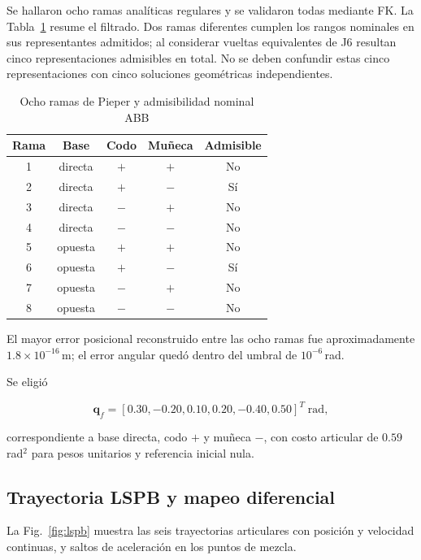 \documentclass[conference]{IEEEtran}
\begin{document}
Se hallaron ocho ramas analíticas regulares y se validaron todas mediante FK. La Tabla~\ref{tab:ramas} resume el filtrado. Dos ramas diferentes cumplen los rangos nominales en sus representantes admitidos; al considerar vueltas equivalentes de J6 resultan cinco representaciones admisibles en total. No se deben confundir estas cinco representaciones con cinco soluciones geométricas independientes.

\begin{table}[!t]
\caption{Ocho ramas de Pieper y admisibilidad nominal ABB}
\label{tab:ramas}
\centering
\footnotesize
\setlength{\tabcolsep}{4pt}
\begin{tabular}{ccccc}
\toprule
Rama & Base & Codo & Muñeca & Admisible \\
\midrule
1 & directa & $+$ & $+$ & No \\
2 & directa & $+$ & $-$ & Sí \\
3 & directa & $-$ & $+$ & No \\
4 & directa & $-$ & $-$ & No \\
5 & opuesta & $+$ & $+$ & No \\
6 & opuesta & $+$ & $-$ & Sí \\
7 & opuesta & $-$ & $+$ & No \\
8 & opuesta & $-$ & $-$ & No \\
\bottomrule
\end{tabular}
\end{table}

El mayor error posicional reconstruido entre las ocho ramas fue aproximadamente $1.8\times10^{-16}$\,m; el error angular quedó dentro del umbral de $10^{-6}$\,rad.

Se eligió

\begin{equation}
\bm q_f=
[0.30,-0.20,0.10,0.20,-0.40,0.50]^T
\;\mathrm{rad},
\end{equation}

correspondiente a base directa, codo $+$ y muñeca $-$, con costo articular de $0.59$\,rad$^2$ para pesos unitarios y referencia inicial nula.

\subsection{Trayectoria LSPB y mapeo diferencial}

La Fig.~\ref{fig:lspb} muestra las seis trayectorias articulares con posición y velocidad continuas, y saltos de aceleración en los puntos de mezcla.
\end{document}
